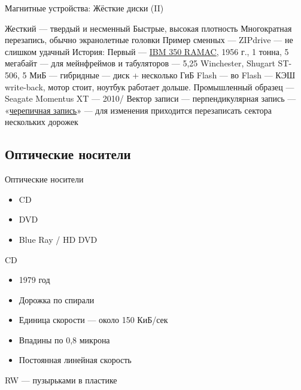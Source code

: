 \documentclass[xetex,aspectratio=43]{beamer}
\begin{document}
\begin{frame}{Магнитные устройства:  Жёсткие диски (II)}

\begin{outline}
    \tightlist
    \1 Жесткий --- твердый и несменный
    \1 Быстрые, высокая плотность
    \1 Многократная перезапись, обычно экранолетные головки
    \1 Пример сменных --- ZIPdrive --- не слишком удачный
    \1 История:
        \2 Первый --- \href{https://en.wikipedia.org/wiki/IBM_305_RAMAC}{IBM 350 RAMAC}, 1956 г., 1 тонна, 5 мегабайт --- для мейнфреймов и табуляторов
         --- 5,25 Winchester, Shugart ST-506, 5 МиБ
         --- гибридные --- диск + несколько ГиБ Flash --- во Flash --- КЭШ write-back, мотор стоит, ноутбук работает дольше. Промышленный образец --- Seagate Momentus XT --- 2010/
        \2 Вектор записи
             --- перпендикулярная запись
             --- «\href{https://en.wikipedia.org/wiki/Shingled\_magnetic\_recording}{черепичная запись}» --- для изменения приходится перезаписать сектора нескольких дорожек
\end{outline}
\end{frame}

\subsection{Оптические носители}

\begin{frame}{Оптические носители}
\begin{itemize}
\tightlist
\item
  CD
\item
  DVD
\item
  Blue Ray / HD DVD
\end{itemize}
\end{frame}

\begin{frame}{CD}
        \begin{itemize}
            \tightlist
            \item
            1979 год
            \item
            Дорожка по спирали
            \item
            Единица скорости --- около 150 КиБ/сек
            \item
            Впадины по 0,8 микрона
            \item
            Постоянная линейная скорость
        \end{itemize}

        RW --- пузырьками в пластике
\end{frame}
\end{document}
